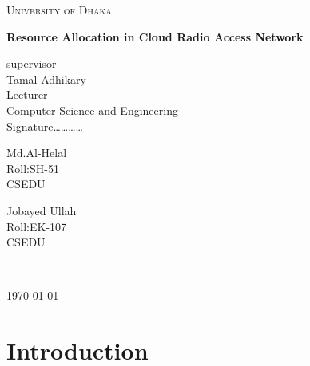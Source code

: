\documentclass[paper=a4paper,12pt]{article}
\begin{document}

\begin{titlepage}
\centering
{\scshape\LARGE University of Dhaka \par}
\vspace{1.5cm}
{\huge\bfseries Resource Allocation in Cloud Radio Access Network\par}
\vspace{2cm}
supervisor -\\
\vspace{.5cm}
Tamal Adhikary\\
Lecturer\\
Computer Science and Engineering\\
Signature\ldots\ldots\ldots\ldots\\
\vspace{3cm}
  \parbox{3cm}{
\centering Md.Al-Helal\\Roll:SH-51\\CSEDU}\hspace{4cm}
\parbox{3cm}{
{\centering Jobayed Ullah\\Roll:EK-107\\CSEDU}}\\
%
\vfill
{\large \today\par}
\end{titlepage}

\section{Introduction}
\end{document}
